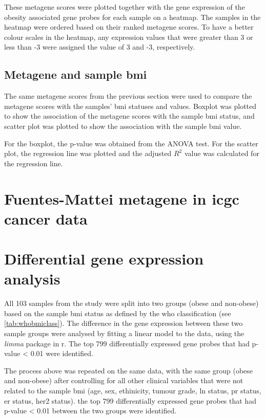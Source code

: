 These \gls{metagene} scores were plotted together with the gene expression of the obesity associated gene probes for each sample on a heatmap.
The samples in the heatmap were ordered based on their ranked \gls{metagene} scores.
To have a better colour scales in the heatmap, any expression values that were greater than 3 or less than -3 were assigned the value of 3 and -3, respectively.

\subsection{Metagene and sample \gls{bmi}}
\label{subsec:fmmetabmi}

The same \gls{metagene} scores from the previous section were used to compare the \gls{metagene} scores with the samples' \gls{bmi} statuses and values.
Boxplot was plotted to show the association of the \gls{metagene} scores with the sample \gls{bmi} status, and scatter plot was plotted to show the association with the sample \gls{bmi} value.

For the boxplot, the p-value was obtained from the ANOVA test.
For the scatter plot, the regression line was plotted and the adjusted $R^2$ value was calculated for the regression line.


\section{Fuentes-Mattei metagene in \gls{icgc} cancer data}
\label{sec:fmmetaicgc}



\section{Differential gene expression analysis}
\label{sec:deg}

All 103 samples from the \citet{Creighton2012} study were split into two groups (obese and non-obese) based on the sample \gls{bmi} status as defined by the \gls{who} classification (see \cref{tab:whobmiclass}).
The difference in the gene expression between these two sample groups were analysed by fitting a linear model to the data, using the \textit{limma} package in \gls{r}.
The top 799 differentially expressed gene probes that had p-value \textless{} 0.01 were identified.

The process above was repeated on the same data, with the same group (obese and non-obese) after controlling for all other clinical variables that were not related to the sample \gls{bmi} (age, sex, ethinicity, tumour grade, \gls{ln} status, \gls{pr} status, \gls{er} status, \gls{her2} status).
the top 799 differentially expressed gene probes that had p-value \textless{} 0.01 between the two groups were identified.

